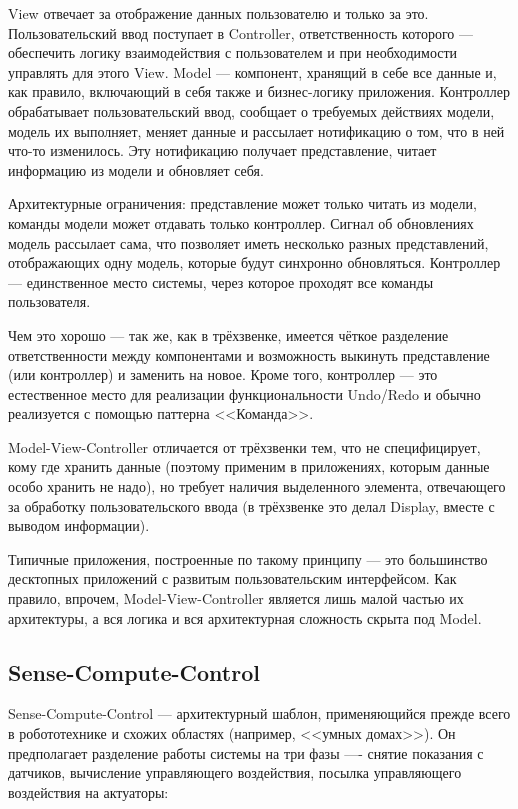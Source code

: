 \documentclass[a5paper]{article}
\begin{document}
View отвечает за отображение данных пользователю и только за это. Пользовательский ввод поступает в Controller, ответственность которого --- обеспечить логику взаимодействия с пользователем и при необходимости управлять для этого View. Model --- компонент, хранящий в себе все данные и, как правило, включающий в себя также и бизнес-логику приложения. Контроллер обрабатывает пользовательский ввод, сообщает о требуемых действиях модели, модель их выполняет, меняет данные и рассылает нотификацию о том, что в ней что-то изменилось. Эту нотификацию получает представление, читает информацию из модели и обновляет себя.

Архитектурные ограничения: представление может только читать из модели, команды модели может отдавать только контроллер. Сигнал об обновлениях модель рассылает сама, что позволяет иметь несколько разных представлений, отображающих одну модель, которые будут синхронно обновляться. Контроллер --- единственное место системы, через которое проходят все команды пользователя.

Чем это хорошо --- так же, как в трёхзвенке, имеется чёткое разделение ответственности между компонентами и возможность выкинуть представление (или контроллер) и заменить на новое. Кроме того, контроллер --- это естественное место для реализации функциональности Undo/Redo и обычно реализуется с помощью паттерна <<Команда>>. 

Model-View-Controller отличается от трёхзвенки тем, что не специфицирует, кому где хранить данные (поэтому применим в приложениях, которым данные особо хранить не надо), но требует наличия выделенного элемента, отвечающего за обработку пользовательского ввода (в трёхзвенке это делал Display, вместе с выводом информации).

Типичные приложения, построенные по такому принципу --- это большинство десктопных приложений с развитым пользовательским интерфейсом. Как правило, впрочем, Model-View-Controller является лишь малой частью их архитектуры, а вся логика и вся архитектурная сложность скрыта под Model.

\subsection{Sense-Compute-Control}

Sense-Compute-Control --- архитектурный шаблон, применяющийся прежде всего в робототехнике и схожих областях (например, <<умных домах>>). Он предполагает разделение работы системы на три фазы ---- снятие показания с датчиков, вычисление управляющего воздействия, посылка управляющего воздействия на актуаторы:
\end{document}
